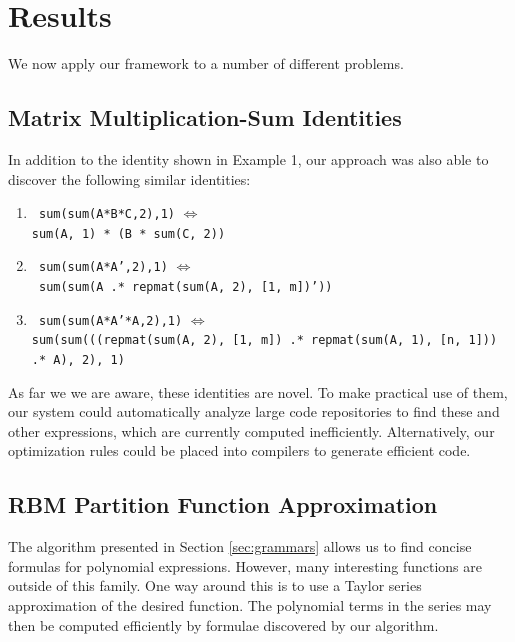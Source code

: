
\vspace{-2mm}
\section{Results}
\vspace{-2mm}

We now apply our framework to a number of different problems.

\vspace{-2mm}
\subsection{Matrix Multiplication-Sum Identities}
In addition to the identity shown in Example 1, our approach was also
able to discover the following similar identities:
\begin{enumerate}
\item \texttt{ sum(sum(A*B*C,2),1)} $\iff$ \\ \texttt{sum(A, 1) * (B * sum(C, 2))}
\item \texttt{ sum(sum(A*A',2),1)} $\iff$ \\ \hglue -5mm \texttt{ sum(sum(A .* repmat(sum(A, 2), [1, m])'))}
\item \texttt{ sum(sum(A*A'*A,2),1)} $\iff$ \\ \texttt{sum(sum(((repmat(sum(A, 2), [1, m]) .* repmat(sum(A, 1), [n, 1])) .* A), 2), 1) 
} 
\end{enumerate}

As far we we are aware, these identities are novel. To make practical
use of them, our
system could automatically analyze large code repositories to find
these and other expressions, which are currently computed
inefficiently. Alternatively, our optimization rules could be placed
into compilers to generate efficient code.

\subsection{RBM Partition Function Approximation}
\label{partitionfunction}

The algorithm presented in Section
\ref{sec:grammars} allows us to find concise formulas for polynomial expressions.
However, many interesting functions are outside of this
family. One way around this is to use a Taylor series approximation of
the desired function. The polynomial terms in the series may then be
computed efficiently by formulae discovered by our algorithm.

